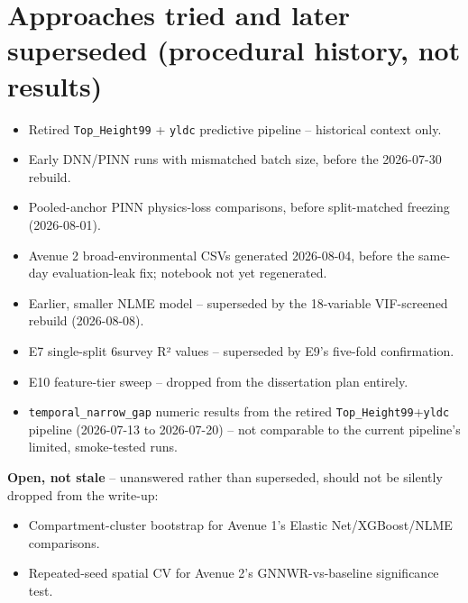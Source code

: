 \documentclass[11pt,a4paper]{report}
\begin{document}
\section*{Approaches tried and later superseded (procedural history, not results)}

\begin{itemize}
\setlength\itemsep{0pt}
\item Retired \texttt{Top\_Height99} + \texttt{yldc} predictive pipeline -- historical context only.
\item Early DNN/PINN runs with mismatched batch size, before the 2026-07-30 rebuild.
\item Pooled-anchor PINN physics-loss comparisons, before split-matched freezing (2026-08-01).
\item Avenue 2 broad-environmental CSVs generated 2026-08-04, before the same-day evaluation-leak
fix; notebook not yet regenerated.
\item Earlier, smaller NLME model -- superseded by the 18-variable VIF-screened rebuild (2026-08-08).
\item E7 single-split 6survey R² values -- superseded by E9's five-fold confirmation.
\item E10 feature-tier sweep -- dropped from the dissertation plan entirely.
\item \texttt{temporal\_narrow\_gap} numeric results from the retired \texttt{Top\_Height99}+\texttt{yldc}
pipeline (2026-07-13 to 2026-07-20) -- not comparable to the current pipeline's limited,
smoke-tested runs.
\end{itemize}

\textbf{Open, not stale} -- unanswered rather than superseded, should not be silently dropped from
the write-up:
\begin{itemize}
\setlength\itemsep{0pt}
\item Compartment-cluster bootstrap for Avenue 1's Elastic Net/XGBoost/NLME comparisons.
\item Repeated-seed spatial CV for Avenue 2's GNNWR-vs-baseline significance test.
\end{itemize}

\end{document}
